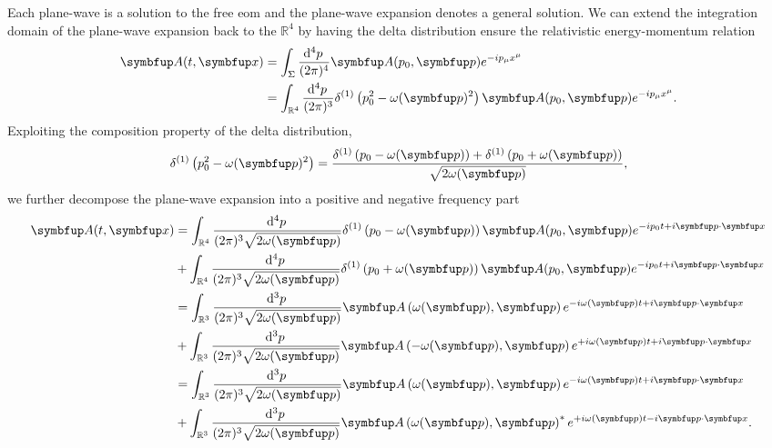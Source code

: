 Each plane-wave is a solution to the free \gls{eom} and the plane-wave expansion denotes a general solution.
We can extend the integration domain of the plane-wave expansion back to the $\mathbb{R}^4$ by having the delta distribution ensure the relativistic energy-momentum relation
\begin{equation}
	\begin{split}
		\vb{A}(t,\vb{x})
		&=
		\int_\Sigma\frac{\dd[4]{p}}{(2\pi)^4}
		\vb{A}(p_0,\vb{p})
		e^{-ip_\mu x^\mu}
		\\
		&=
		\int_{\mathbb{R}^4}\frac{\dd[4]{p}}{(2\pi)^3}
		\delta^{(1)}
		\left(
			p_0^2
			-
			\omega(\vb{p})^2
		\right)
		\vb{A}(p_0,\vb{p})
		e^{-ip_\mu x^\mu}
		.
	\end{split}
\end{equation}
Exploiting the composition property of the delta distribution,
\begin{equation}
	\delta^{(1)}
	\left(
		p_0^2
		-
		\omega(\vb{p})^2
	\right)
	=
	\frac{
		\delta^{(1)}
		\left(p_0-\omega(\vb{p})\right)
		+
		\delta^{(1)}
		\left(p_0+\omega(\vb{p})\right)
	}{\sqrt{2\omega(\vb{p})}}
	,
\end{equation}
we further decompose the plane-wave expansion into a positive and negative frequency part
\begin{equation}
	\begin{split}
		\vb{A}(t,\vb{x})
		&=
		\int_{\mathbb{R}^4}\frac{\dd[4]{p}}{(2\pi)^3\sqrt{2\omega(\vb{p})}}
		\delta^{(1)}
		\left(
			p_0
			-
			\omega(\vb{p})
		\right)
		\vb{A}(p_0,\vb{p})
		e^{-ip_0t+i\vb{p}\vdot\vb{x}}
		\\
		&+
		\int_{\mathbb{R}^4}\frac{\dd[4]{p}}{(2\pi)^3\sqrt{2\omega(\vb{p})}}
		\delta^{(1)}
		\left(
			p_0
			+
			\omega(\vb{p})
		\right)
		\vb{A}(p_0,\vb{p})
		e^{-ip_0t+i\vb{p}\vdot\vb{x}}
		\\
		&=
		\int_{\mathbb{R}^3}\frac{\dd[3]{p}}{(2\pi)^3\sqrt{2\omega(\vb{p})}}
		\vb{A}\left(\omega(\vb{p}),\vb{p}\right)
		e^{-i\omega(\vb{p})t+i\vb{p}\vdot\vb{x}}
		\\
		&+
		\int_{\mathbb{R}^3}\frac{\dd[3]{p}}{(2\pi)^3\sqrt{2\omega(\vb{p})}}
		\vb{A}\left(-\omega(\vb{p}),\vb{p}\right)
		e^{+i\omega(\vb{p})t+i\vb{p}\vdot\vb{x}}
		\\
		&=
		\int_{\mathbb{R}^3}\frac{\dd[3]{p}}{(2\pi)^3\sqrt{2\omega(\vb{p})}}
		\vb{A}\left(\omega(\vb{p}),\vb{p}\right)
		e^{-i\omega(\vb{p})t+i\vb{p}\vdot\vb{x}}
		\\
		&+
		\int_{\mathbb{R}^3}\frac{\dd[3]{p}}{(2\pi)^3\sqrt{2\omega(\vb{p})}}
		\vb{A}\left(\omega(\vb{p}),\vb{p}\right)^*
		e^{+i\omega(\vb{p})t-i\vb{p}\vdot\vb{x}}
		.
	\end{split}
	\label{eq:maxwell_plane_wave_expansion}
\end{equation}
